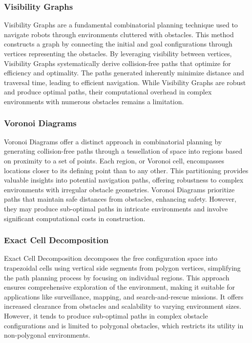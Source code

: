 \subsubsection{Visibility Graphs}

Visibility Graphs are a fundamental combinatorial planning technique used to navigate robots through environments cluttered with obstacles. This method constructs a graph by connecting the initial and goal configurations through vertices representing the obstacles. By leveraging visibility between vertices, Visibility Graphs systematically derive collision-free paths that optimize for efficiency and optimality. The paths generated inherently minimize distance and traversal time, leading to efficient navigation. While Visibility Graphs are robust and produce optimal paths, their computational overhead in complex environments with numerous obstacles remains a limitation.


\subsubsection{Voronoi Diagrams}

Voronoi Diagrams offer a distinct approach in combinatorial planning by generating collision-free paths through a tessellation of space into regions based on proximity to a set of points. Each region, or Voronoi cell, encompasses locations closer to its defining point than to any other. This partitioning provides valuable insights into potential navigation paths, offering robustness to complex environments with irregular obstacle geometries. Voronoi Diagrams prioritize paths that maintain safe distances from obstacles, enhancing safety. However, they may produce sub-optimal paths in intricate environments and involve significant computational costs in construction.


\subsubsection{Exact Cell Decomposition}

Exact Cell Decomposition decomposes the free configuration space into trapezoidal cells using vertical side segments from polygon vertices, simplifying the path planning process by focusing on individual regions. This approach ensures comprehensive exploration of the environment, making it suitable for applications like surveillance, mapping, and search-and-rescue missions. It offers increased clearance from obstacles and scalability to varying environment sizes. However, it tends to produce sub-optimal paths in complex obstacle configurations and is limited to polygonal obstacles, which restricts its utility in non-polygonal environments.


